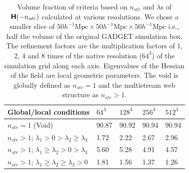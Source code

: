 \documentclass[fleqn,usenatbib,useAMS]{mnras}
\begin{document}
\begin{table}
  \caption{Volume fraction of criteria based on $n_{str}$ and $\lambda$s of $\textbf{\textsf{H}}(-n_{str})$ calculated at various resolutions. We chose a smaller slice of $ 50 h^{-1} \text{Mpc} \times 50 h^{-1} \text{Mpc} \times 50 h^{-1} \text{Mpc} $ i.e., half the volume of the original GADGET simulation box. The refinement factors are the multiplication factors of 1, 2, 4 and 8 times of the native resolution ($64^3$) of the simulation grid along each axis. Eigenvalues of the Hessian of the field are local geometric parameters. The void is globally defined as $n_{str} = 1$ and the multistream web structure as $n_{str} > 1$.}


\begin{tabular}{|l|l|l|l|l}
\hline
Global/local conditions & $64^3$   & $128^3$   & $256^3$  & $512^3$  \\  \hline
$n_{str} = 1$ (Void)     &    90.87   & 90.92  & 90.94 & 90.94 \\ \hline
$n_{str} > 1$; $\lambda_1 > 0 > \lambda_2 \geq \lambda_3 $  &  1.72 & 2.22 & 2.67 & 2.96    \\ \hline
$n_{str} > 1$; $\lambda_1 \geq \lambda_2 > 0 > \lambda_3 $ & 5.60 & 5.28 & 4.91 & 4.57   \\ \hline
$n_{str} > 1$; $\lambda_1 \geq \lambda_2 \geq \lambda_3 > 0$ & 1.81 & 1.56 & 1.37 & 1.26 \\ \hline

\end{tabular}
\label{tab:VolfrRefLambda}
\end{table}
\end{document}
